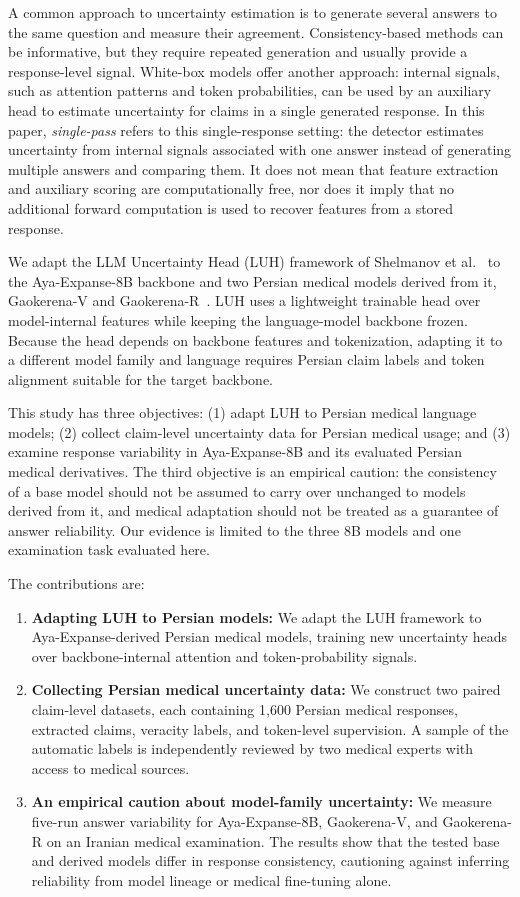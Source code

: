 \documentclass[conference,a4paper]{IEEEtran}
\begin{document}
A common approach to uncertainty estimation is to generate several answers to the same question and measure their agreement. Consistency-based methods can be informative, but they require repeated generation and usually provide a response-level signal. White-box models offer another approach: internal signals, such as attention patterns and token probabilities, can be used by an auxiliary head to estimate uncertainty for claims in a single generated response. In this paper, \emph{single-pass} refers to this single-response setting: the detector estimates uncertainty from internal signals associated with one answer instead of generating multiple answers and comparing them. It does not mean that feature extraction and auxiliary scoring are computationally free, nor does it imply that no additional forward computation is used to recover features from a stored response.

We adapt the LLM Uncertainty Head (LUH) framework of Shelmanov et al.~\cite{b1} to the Aya-Expanse-8B backbone and two Persian medical models derived from it, Gaokerena-V and Gaokerena-R~\cite{b2,b3}. LUH uses a lightweight trainable head over model-internal features while keeping the language-model backbone frozen. Because the head depends on backbone features and tokenization, adapting it to a different model family and language requires Persian claim labels and token alignment suitable for the target backbone.

This study has three objectives: (1) adapt LUH to Persian medical language models; (2) collect claim-level uncertainty data for Persian medical usage; and (3) examine response variability in Aya-Expanse-8B and its evaluated Persian medical derivatives. The third objective is an empirical caution: the consistency of a base model should not be assumed to carry over unchanged to models derived from it, and medical adaptation should not be treated as a guarantee of answer reliability. Our evidence is limited to the three 8B models and one examination task evaluated here.

The contributions are:
\begin{enumerate}[leftmargin=*]
\item \textbf{Adapting LUH to Persian models:} We adapt the LUH framework to Aya-Expanse-derived Persian medical models, training new uncertainty heads over backbone-internal attention and token-probability signals.
\item \textbf{Collecting Persian medical uncertainty data:} We construct two paired claim-level datasets, each containing 1,600 Persian medical responses, extracted claims, veracity labels, and token-level supervision. A sample of the automatic labels is independently reviewed by two medical experts with access to medical sources.
\item \textbf{An empirical caution about model-family uncertainty:} We measure five-run answer variability for Aya-Expanse-8B, Gaokerena-V, and Gaokerena-R on an Iranian medical examination. The results show that the tested base and derived models differ in response consistency, cautioning against inferring reliability from model lineage or medical fine-tuning alone.
\end{enumerate}
\end{document}
